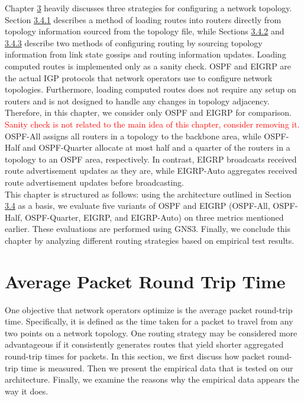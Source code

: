 \documentclass{uiucthesis2021}
\begin{document}
\noindent Chapter \hyperref[c3]{3} heavily discusses three strategies for configuring a network topology. Section \hyperref[s341]{3.4.1} describes a method of loading routes into routers directly from topology information sourced from the topology file, while Sections \hyperref[s342]{3.4.2} and \hyperref[s343]{3.4.3} describe two methods of configuring routing by sourcing topology information from link state gossips and routing information updates. Loading computed routes is implemented only as a sanity check. OSPF and EIGRP are the actual IGP protocols that network operators use to configure network topologies. Furthermore, loading computed routes does not require any setup on routers and is not designed to handle any changes in topology adjacency. Therefore, in this chapter, we consider only OSPF and EIGRP for comparison. \textcolor{red}{Sanity check is not related to the main idea of this chapter, consider removing it.} OSPF-All assigns all routers in a topology to the backbone area, while OSPF-Half and OSPF-Quarter allocate at most half and a quarter of the routers in a topology to an OSPF area, respectively. In contrast, EIGRP broadcasts received route advertisement updates as they are, while EIGRP-Auto aggregates received route advertisement updates before broadcasting. \\

\noindent This chapter is structured as follows: using the architecture outlined in Section \hyperref[c34]{3.4} as a basis, we evaluate five variants of OSPF and EIGRP (OSPF-All, OSPF-Half, OSPF-Quarter, EIGRP, and EIGRP-Auto) on three metrics mentioned earlier. These evaluations are performed using GNS3. Finally, we conclude this chapter by analyzing different routing strategies based on empirical test results.

\section{Average Packet Round Trip Time}
\noindent One objective that network operators optimize is the average packet round-trip time. Specifically, it is defined as the time taken for a packet to travel from any two points on a network topology. One routing strategy may be considered more advantageous if it consistently generates routes that yield shorter aggregated round-trip times for packets. In this section, we first discuss how packet round-trip time is measured. Then we present the empirical data that is tested on our architecture. Finally, we examine the reasons why the empirical data appears the way it does. \\
\end{document}
